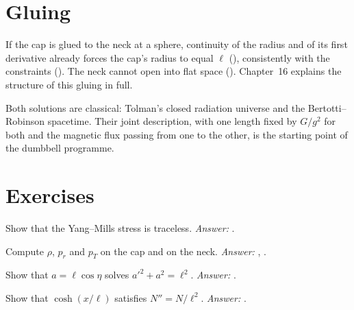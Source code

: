 \section{Gluing}

If the cap is glued to the neck at a sphere, continuity of the radius and of its first derivative already forces the cap's radius to equal $\ell$ (), consistently with the constraints (). The neck cannot open into flat space (). Chapter~16 explains the structure of this gluing in full.

\begin{standsbox}
Both solutions are classical: Tolman's closed radiation universe and the Bertotti--Robinson spacetime. Their joint description, with one length fixed by $G/g^2$ for both and the magnetic flux passing from one to the other, is the starting point of the dumbbell programme.
\end{standsbox}

\section*{Exercises}
\begin{exercise}Show that the Yang--Mills stress is traceless. \emph{Answer:} .\end{exercise}
\begin{exercise}Compute $\rho$, $p_r$ and $p_T$ on the cap and on the neck. \emph{Answer:} , .\end{exercise}
\begin{exercise}Show that $a=\ell\cos\eta$ solves $a'^2+a^2=\ell^2$. \emph{Answer:} .\end{exercise}
\begin{exercise}Show that $\cosh(x/\ell)$ satisfies $N''=N/\ell^2$. \emph{Answer:} .\end{exercise}
